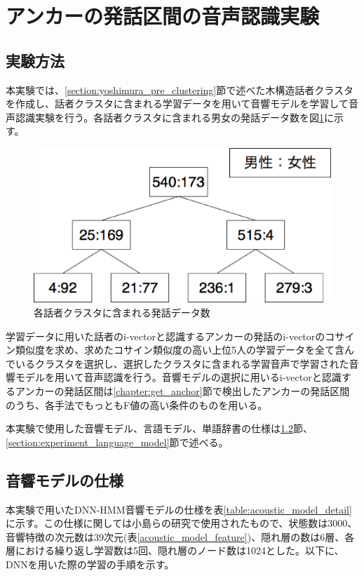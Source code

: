 \section{アンカーの発話区間の音声認識実験}

\subsection{実験方法}
本実験では、\ref{section:yoshimura_pre_clustering}節で述べた木構造話者クラスタを作成し、話者クラスタに含まれる学習データを用いて音響モデルを学習して音声認識実験を行う。各話者クラスタに含まれる男女の発話データ数を図\ref{fig:yoshimura_kikouzou}に示す。


\begin{figure}[H]
  \begin{center}
    \includegraphics[scale=0.5]{./figure/yoshimura.eps}
  \end{center}
  \caption{各話者クラスタに含まれる発話データ数 \label{fig:yoshimura_kikouzou}}
\end{figure}

学習データに用いた話者のi-vectorと認識するアンカーの発話のi-vectorのコサイン類似度を求め、求めたコサイン類似度の高い上位5人の学習データを全て含んでいるクラスタを選択し、選択したクラスタに含まれる学習音声で学習された音響モデルを用いて音声認識を行う。音響モデルの選択に用いるi-vectorと認識するアンカーの発話区間は\ref{chapter:get_anchor}節で検出したアンカーの発話区間のうち、各手法でもっともF値の高い条件のものを用いる。\par

本実験で使用した音響モデル、言語モデル、単語辞書の仕様は\ref{section:experiment_acoustic_model}節、\ref{section:experiment_language_model}節で述べる。

\subsection{音響モデルの仕様}
\label{section:experiment_acoustic_model}
本実験で用いたDNN-HMM音響モデルの仕様を表\ref{table:acoustic_model_detail}に示す。この仕様に関しては小島らの研究\cite{kojima}で使用されたもので、状態数は3000、音響特徴の次元数は39次元(表\ref{acoustic_model_feature})、隠れ層の数は6層、各層における繰り返し学習数は5回、隠れ層のノード数は1024とした。以下に、DNNを用いた際の学習の手順を示す。

